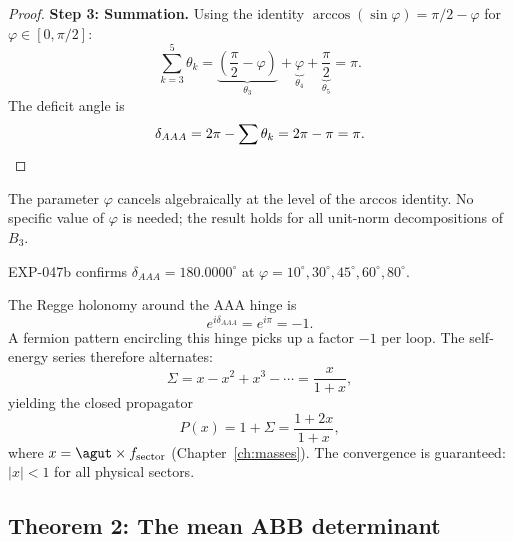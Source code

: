 \begin{proof}
\medskip\noindent\textbf{Step 3: Summation.}
Using the identity $\arccos(\sin\varphi) = \pi/2 - \varphi$ for
$\varphi \in [0, \pi/2]$:
\begin{equation}
\sum_{k=3}^{5} \theta_k
= \underbrace{\left(\frac{\pi}{2} - \varphi\right)}_{\theta_3}
+ \underbrace{\varphi}_{\theta_4}
+ \underbrace{\frac{\pi}{2}}_{\theta_5}
= \pi.
\end{equation}
The deficit angle is
\begin{equation}
\delta_{AAA} = 2\pi - \sum\theta_k = 2\pi - \pi = \pi. \qedhere
\end{equation}
\end{proof}

\begin{remark}[Universality]
The parameter $\varphi$ cancels algebraically at the level of the
arccos identity.  No specific value of $\varphi$ is needed; the result
holds for all unit-norm decompositions of $B_3$.
\end{remark}

\begin{remark}
EXP-047b confirms $\delta_{AAA} = 180.0000^\circ$ at
$\varphi = 10^\circ, 30^\circ, 45^\circ, 60^\circ, 80^\circ$.
\end{remark}

\begin{corollary}
\label{cor:alternating}
The Regge holonomy around the AAA hinge is
\begin{equation}
e^{i\delta_{AAA}} = e^{i\pi} = -1.
\end{equation}
A fermion pattern encircling this hinge picks up a factor $-1$ per
loop.  The self-energy series therefore alternates:
\begin{equation}
\Sigma = x - x^2 + x^3 - \cdots = \frac{x}{1+x},
\end{equation}
yielding the closed propagator
\begin{equation}
P(x) = 1 + \Sigma = \frac{1 + 2x}{1 + x},
\end{equation}
where $x = \agut \times f_{\text{sector}}$ (Chapter~\ref{ch:masses}).
The convergence is guaranteed: $|x| < 1$ for all physical sectors.
\end{corollary}

\subsection{Theorem 2: The mean ABB determinant}
\label{sec:thm_ABB}

